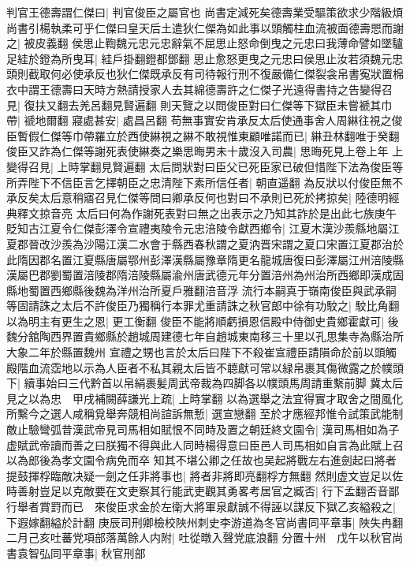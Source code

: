 判官王德壽謂仁傑曰|{
	判官俊臣之屬官也}
尚書定減死矣德壽業受驅策欲求少階級煩尚書引楊執柔可乎仁傑曰皇天后土遣狄仁傑為如此事以頭觸柱血流被面德壽愳而謝之|{
	被皮義翻}
侯思止鞫魏元忠元忠辭氣不屈思止怒命倒曳之元忠曰我薄命譬如墜驢足絓於鐙為所曳耳|{
	絓戶掛翻鐙都鄧翻}
思止愈怒更曳之元忠曰侯思止汝若須魏元忠頭則截取何必使承反也狄仁傑既承反有司待報行刑不復嚴備仁傑裂衾帛書寃狀置棉衣中謂王德壽曰天時方熱請授家人去其綿德壽許之仁傑子光遠得書持之告變得召見|{
	復扶又翻去羌呂翻見賢遍翻}
則天覽之以問俊臣對曰仁傑等下獄臣未嘗褫其巾帶|{
	禠地爾翻}
寢處甚安|{
	處昌呂翻}
苟無事實安肯承反太后使通事舍人周綝往視之俊臣暫假仁傑等巾帶羅立於西使綝視之綝不敢視惟東顧唯諾而已|{
	綝丑林翻唯于癸翻}
俊臣又詐為仁傑等謝死表使綝奏之樂思晦男未十歲沒入司農|{
	思晦死見上卷上年}
上變得召見|{
	上時掌翻見賢遍翻}
太后問狀對曰臣父已死臣家已破但惜陛下法為俊臣等所弄陛下不信臣言乞擇朝臣之忠清陛下素所信任者|{
	朝直遥翻}
為反狀以付俊臣無不承反矣太后意稍寤召見仁傑等問曰卿承反何也對曰不承則已死於拷掠矣|{
	陸德明經典釋文掠音亮}
太后曰何為作謝死表對曰無之出表示之乃知其詐於是出此七族庚午貶知古江夏令仁傑彭澤令宣禮夷陵令元忠涪陵令獻西鄉令|{
	江夏木漢沙羨縣地屬江夏郡晉改沙羨為沙陽江漢二水會于縣西春秋謂之夏汭晋宋謂之夏口宋置江夏郡治於此隋因郡名置江夏縣唐屬鄂州彭澤漢縣屬豫章隋更名龍城唐復曰彭澤屬江州涪陵縣漢屬巴郡劉蜀置涪陵郡隋涪陵縣屬渝州唐武德元年分置涪州為州治所西鄉即漢成固縣地蜀置西鄉縣後魏為洋州治所夏戶雅翻涪音浮}
流行本嗣真于嶺南俊臣與武承嗣等固請誅之太后不許俊臣乃獨稱行本罪尤重請誅之秋官郎中徐有功駮之|{
	駮比角翻}
以為明主有更生之恩|{
	更工衡翻}
俊臣不能將順虧損恩信殿中侍御史貴鄉霍獻可|{
	後魏分舘陶西界置貴鄉縣於趙城周建德七年自趙城東南移三十里以孔思集寺為縣治所大象二年於縣置魏州}
宣禮之甥也言於太后曰陛下不殺崔宣禮臣請隕命於前以頭觸殿階血流霑地以示為人臣者不私其親太后皆不聼獻可常以緑帛裹其傷微露之於幞頭下|{
	續事始曰三代黔首以帛絹裹髪周武帝裁為四脚各以幞頭馬周請重繫前脚}
冀太后見之以為忠　甲戌補闕薛謙光上疏|{
	上時掌翻}
以為選舉之法宜得實才取舍之間風化所繫今之選人咸稱覓舉奔競相尚諠訴無慙|{
	選宣戀翻}
至於才應經邦惟令試策武能制敵止驗彎弧昔漢武帝見司馬相如賦恨不同時及置之朝廷終文園令|{
	漢司馬相如為子虚賦武帝讀而善之曰朕獨不得與此人同時楊得意曰臣邑人司馬相如自言為此賦上召以為郎後為孝文園令病免而卒}
知其不堪公卿之任故也吴起將戰左右進劍起曰將者提鼓揮桴臨敵决疑一劍之任非將事也|{
	將者非將即亮翻桴方無翻}
然則虚文豈足以佐時善射豈足以克敵要在文吏察其行能武吏觀其勇畧考居官之臧否|{
	行下孟翻否音鄙}
行舉者賞罸而已　來俊臣求金於左衛大將軍泉獻誠不得誣以謀反下獄乙亥縊殺之|{
	下遐嫁翻縊於計翻}
庚辰司刑卿檢校陜州刺史李游道為冬官尚書同平章事|{
	陜失冉翻}
二月己亥吐蕃党項部落萬餘人内附|{
	吐從暾入聲党底浪翻}
分置十州　戊午以秋官尚書袁智弘同平章事|{
	秋官刑部}
